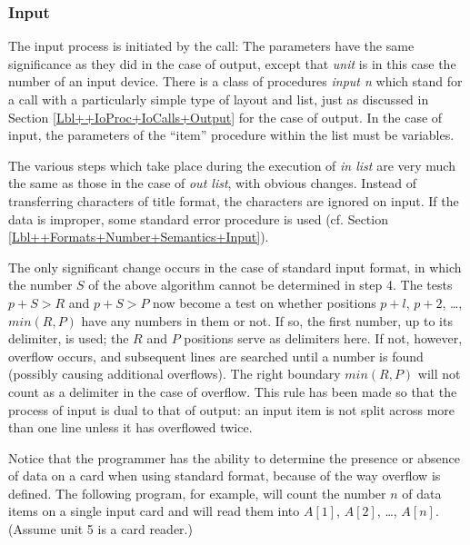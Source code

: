 \documentclass[a4paper,11pt]{article}
\begin{document}
\subsubsection{Input}

The input process is initiated by the call:
\noindent{}The parameters have the same significance as they did in
the case of output, except that {\it unit} is in this case the number
of an input device.  There is a class of procedures {\it input n}
which stand for a call with a particularly simple type of layout and
list, just as discussed in Section \ref{Lbl++IoProc+IoCalls+Output}
for the case of output.  In the case of input, the parameters of the
``item'' procedure within the list must be variables.

The various steps which take place during the execution of {\it in
list} are very much the same as those in the case of {\it out list},
with obvious changes.  Instead of transferring characters of title
format, the characters are ignored on input.  If the data is improper,
some standard error procedure is used (cf. Section
\ref{Lbl++Formats+Number+Semantics+Input}).

The only significant change occurs in the case of standard input
format, in which the number $S$ of the above algorithm cannot be
determined in step 4.  The tests $p+S>R$ and $p+S>P$ now become a test
on whether positions $p+l$, $p+2$, \dots, $min(R, P)$ have any numbers
in them or not.  If so, the first number, up to its delimiter, is
used; the $R$ and $P$ positions serve as delimiters here.  If not,
however, overflow occurs, and subsequent lines are searched until a
number is found (possibly causing additional overflows). The right
boundary $min(R, P)$ will not count as a delimiter in the case of
overflow.  This rule has been made so that the process of input is
dual to that of output: an input item is not split across more than
one line unless it has overflowed twice.

Notice that the programmer has the ability to determine the presence
or absence of data on a card when using standard format, because of
the way overflow is defined.  The following program, for example, will
count the number $n$ of data items on a single input card and will
read them into $A[1]$, $A[2]$, \dots, $A[n]$. (Assume unit 5 is a card
reader.)

\end{document}
